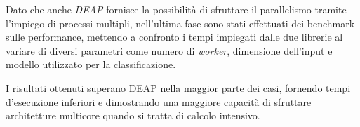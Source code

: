 
Dato che anche \textit{DEAP} fornisce la possibilità di sfruttare il
parallelismo tramite l'impiego di processi multipli, nell'ultima fase sono
stati effettuati dei benchmark sulle performance, mettendo a confronto i
tempi impiegati dalle due librerie al variare di diversi parametri come numero
di \textit{worker}, dimensione dell'input e modello utilizzato per la
classificazione.

I risultati ottenuti superano DEAP nella maggior parte dei casi, fornendo tempi
d'esecuzione inferiori e dimostrando una maggiore capacità di sfruttare
architetture multicore quando si tratta di calcolo intensivo.